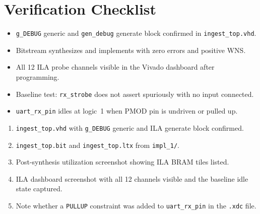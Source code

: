 \documentclass[11pt,letterpaper]{article}
\begin{document}
\section{Verification Checklist}
\begin{itemize}[leftmargin=2em]
	\item[$\square$] \texttt{g\_DEBUG} generic and \texttt{gen\_debug} generate block confirmed in \texttt{ingest\_top.vhd}.
	\item[$\square$] Bitstream synthesizes and implements with zero errors and positive \mbox{WNS}.
	\item[$\square$] All 12 \mbox{ILA} probe channels visible in the Vivado dashboard after programming.
	\item[$\square$] Baseline test: \texttt{rx\_strobe} does not assert spuriously with no \UART{} input connected.
	\item[$\square$] \texttt{uart\_rx\_pin} idles at logic~1 when \mbox{PMOD} pin is undriven or pulled up.
\end{itemize}

\begin{tcolorbox}[deliverable={Lab Handout 3-B Deliverable}]
	\begin{enumerate}[leftmargin=1.2em]
		\item \texttt{ingest\_top.vhd} with \texttt{g\_DEBUG} generic and \mbox{ILA} generate block confirmed.
		\item \texttt{ingest\_top.bit} and \texttt{ingest\_top.ltx} from \texttt{impl\_1/}.
		\item Post-synthesis utilization screenshot showing \mbox{ILA} \mbox{BRAM} tiles listed.
		\item \mbox{ILA} dashboard screenshot with all 12 channels visible and the baseline idle state captured.
		\item Note whether a \texttt{PULLUP} constraint was added to \texttt{uart\_rx\_pin} in the \texttt{.xdc} file.
	\end{enumerate}
\end{tcolorbox}

\printhandoutglossary
\end{document}
